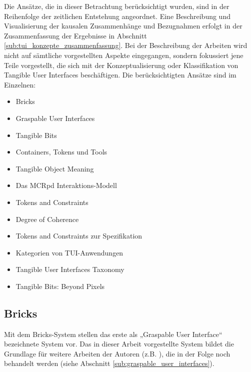 Die Ansätze, die in dieser Betrachtung berücksichtigt wurden, sind in der Reihenfolge der zeitlichen Entstehung angeordnet. Eine Beschreibung und Visualisierung der kausalen Zusammenhänge und Bezugnahmen erfolgt in der Zusammenfassung der Ergebnisse in Abschnitt \ref{sub:tui_konzepte_zusammenfassung}. Bei der Beschreibung der Arbeiten wird nicht auf sämtliche vorgestellten Aspekte eingegangen, sondern fokussiert jene Teile vorgestellt, die sich mit der Konzeptualisierung oder Klassifikation von Tangible User Interfaces beschäftigen. Die berücksichtigten Ansätze sind im Einzelnen:

    \begin{itemize}
    	\item Bricks \citep{Fitzmaurice95}
    	\item Graspable User Interfaces \citep{Fitzmaurice96}
    	\item Tangible Bits \citep{Ishii97}
    	\item Containers, Tokens und Tools \citep{Holmquist99}
		\item Tangible Object Meaning \citep{Underkoffler99}
    	\item Das MCRpd Interaktions-Modell \citep{Ullmer00}
    	\item Tokens and Constraints \citep{Ullmer02}
    	\item Degree of Coherence \citep{Koleva03}
    	\item Tokens and Constraints zur Spezifikation \citep{Shaer04}
    	\item Kategorien von \gls{TUI}-Anwendungen \citep{Klemmer04}
    	\item Tangible User Interfaces Taxonomy \citep{Fishkin04}
    	\item Tangible Bits: Beyond Pixels \citep{Ishii08}
    \end{itemize}


\subsection{Bricks} %
\label{sub:bricks}

Mit dem Bricks-System stellen \citet{Fitzmaurice95} das erste als „Graspable User Interface“ bezeichnete System vor. Das in dieser Arbeit vorgestellte System bildet die Grundlage für weitere Arbeiten der Autoren (z.B. \citep{Fitzmaurice96}), die in der Folge noch behandelt werden (siehe Abschnitt \ref{sub:graspable_user_interfaces}). 

